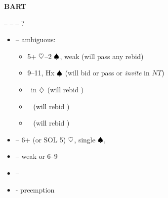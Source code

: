 \textbf{BART}

 --  --  -- ?
\begin{itemize}
  \item {} -- ambiguous:
    \begin{itemize}
      \item 5+ $\heartsuit$--2 $\spadesuit$, weak (will pass any rebid)
      \item 9--11, Hx $\spadesuit$ (will bid or pass  or \emph{invite} in $NT$)
      \item \inv\ in $\diamondsuit$ (will rebid )
      \item \so\ \ws{\c} (will rebid )
      \item \inv\ \ws{\c} (will rebid )
    \end{itemize}
  \item {} -- 6+ (or SOL 5) $\heartsuit$, single $\spadesuit$, \so
  \item {} -- weak \ws{} or 6--9 \wos{}
  \item {} -- \inv\ \wos{\c}
  \item \ctr{3\minor/\h} -\- preemption
\end{itemize}
